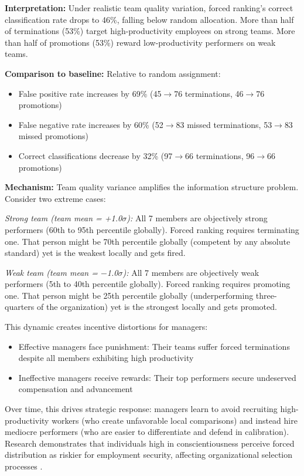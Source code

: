 \documentclass[12pt]{article}
\begin{document}
\textbf{Interpretation:} Under realistic team quality variation, forced ranking's correct classification rate drops to 46\%, falling below random allocation. More than half of terminations (53\%) target high-productivity employees on strong teams. More than half of promotions (53\%) reward low-productivity performers on weak teams.

\textbf{Comparison to baseline:} Relative to random assignment:
\begin{itemize}
\item False positive rate increases by 69\% (45$\rightarrow$76 terminations, 46$\rightarrow$76 promotions)
\item False negative rate increases by 60\% (52$\rightarrow$83 missed terminations, 53$\rightarrow$83 missed promotions)
\item Correct classifications decrease by 32\% (97$\rightarrow$66 terminations, 96$\rightarrow$66 promotions)
\end{itemize}

\textbf{Mechanism:} Team quality variance amplifies the information structure problem. Consider two extreme cases:

\emph{Strong team (team mean = +1.0$\sigma$):} All 7 members are objectively strong performers (60th to 95th percentile globally). Forced ranking requires terminating one. That person might be 70th percentile globally (competent by any absolute standard) yet is the weakest locally and gets fired.

\emph{Weak team (team mean = $-$1.0$\sigma$):} All 7 members are objectively weak performers (5th to 40th percentile globally). Forced ranking requires promoting one. That person might be 25th percentile globally (underperforming three-quarters of the organization) yet is the strongest locally and gets promoted.

This dynamic creates incentive distortions for managers:
\begin{itemize}
\item Effective managers face punishment: Their teams suffer forced terminations despite all members exhibiting high productivity
\item Ineffective managers receive rewards: Their top performers secure undeserved compensation and advancement
\end{itemize}

Over time, this drives strategic response: managers learn to avoid recruiting high-productivity workers (who create unfavorable local comparisons) and instead hire mediocre performers (who are easier to differentiate and defend in calibration). Research demonstrates that individuals high in conscientiousness perceive forced distribution as riskier for employment security, affecting organizational selection processes \citep{blume2013attracted}.
\end{document}
